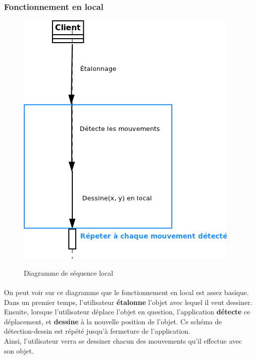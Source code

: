 \documentclass{report}
\begin{document}
			\subsubsection{Fonctionnement en local}
				\begin{figure}[!h]
						\centering
						\includegraphics[scale=0.6]{../images/sequence_local.png}\\
						\caption{Diagramme de séquence local}
						\label{Diagramme de séquence local}
				\end{figure}
				\paragraph{}
				On peut voir sur ce diagramme que le fonctionnement en local est assez basique. Dans un premier temps, l'utilisateur \textbf{étalonne} l'objet avec lequel il veut dessiner. Ensuite, lorsque l'utilisateur déplace l'objet en question, l'application \textbf{détecte} ce déplacement, et \textbf{dessine} à la nouvelle position de l'objet. Ce schéma de détection-dessin est répété jusqu'à fermeture de l'application. \\
				Ainsi, l'utilisateur verra se dessiner chacun des mouvements qu'il effectue avec son objet.

				\newpage
\end{document}
